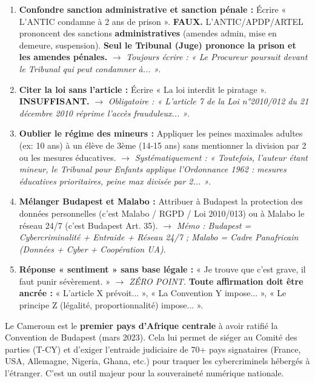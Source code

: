 \documentclass[11pt]{article}
\begin{document}
\begin{attention}
    \begin{enumerate}
        \item \textbf{Confondre sanction administrative et sanction pénale :} Écrire « L'ANTIC condamne à 2 ans de prison ». \textbf{FAUX.} L'ANTIC/APDP/ARTEL prononcent des sanctions \textbf{administratives} (amendes admin, mise en demeure, suspension). \textbf{Seul le Tribunal (Juge) prononce la prison et les amendes pénales.} $\rightarrow$ \textit{Toujours écrire : « Le Procureur poursuit devant le Tribunal qui peut condamner à... »}.
        \item \textbf{Citer la loi sans l'article :} Écrire « La loi interdit le piratage ». \textbf{INSUFFISANT.} $\rightarrow$ \textit{Obligatoire : « L'article 7 de la Loi n°2010/012 du 21 décembre 2010 réprime l'accès frauduleux... »}.
        \item \textbf{Oublier le régime des mineurs :} Appliquer les peines maximales adultes (ex: 10 ans) à un élève de 3ème (14-15 ans) sans mentionner la division par 2 ou les mesures éducatives. $\rightarrow$ \textit{Systématiquement : « Toutefois, l'auteur étant mineur, le Tribunal pour Enfants applique l'Ordonnance 1962 : mesures éducatives prioritaires, peine max divisée par 2... »}.
        \item \textbf{Mélanger Budapest et Malabo :} Attribuer à Budapest la protection des données personnelles (c'est Malabo / RGPD / Loi 2010/013) ou à Malabo le réseau 24/7 (c'est Budapest Art. 35). $\rightarrow$ \textit{Mémo : Budapest = Cybercriminalité + Entraide + Réseau 24/7 ; Malabo = Cadre Panafricain (Données + Cyber + Coopération UA)}.
        \item \textbf{Réponse « sentiment » sans base légale :} « Je trouve que c'est grave, il faut punir sévèrement. » $\rightarrow$ \textit{ZÉRO POINT.} \textbf{Toute affirmation doit être ancrée :} « L'article X prévoit... », « La Convention Y impose... », « Le principe Z (légalité, proportionnalité) impose... ».
    \end{enumerate}
\end{attention}

\begin{savaistu}
    Le Cameroun est le \textbf{premier pays d'Afrique centrale} à avoir ratifié la Convention de Budapest (mars 2023). Cela lui permet de siéger au Comité des parties (T-CY) et d'exiger l'entraide judiciaire de 70+ pays signataires (France, USA, Allemagne, Nigeria, Ghana, etc.) pour traquer les cybercriminels hébergés à l'étranger. C'est un outil majeur pour la souveraineté numérique nationale.
\end{savaistu}
\end{document}

